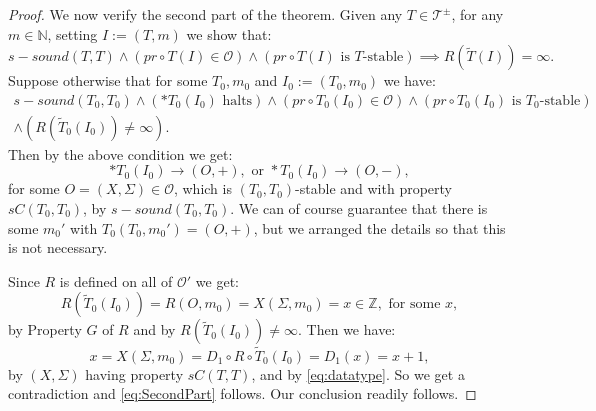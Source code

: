 \documentclass{amsart}  %
\numberwithin{equation}{section}
\theoremstyle{definition}
\theoremstyle{remark}
\DeclareMathOperator {\halt} {halt}
\begin{document}
{\begin{proof}
We now verify the second part of the theorem. 
Given any $T \in \mathcal{T} ^{\pm}  $, for any $m \in \mathbb{N}$, setting $I:= (T,m)$ we show that: 
   \begin{equation} \label{eq:SecondPart}
   s-sound (T,T) \land (pr \circ T (I) \in \mathcal{O})  \land ( pr \circ \text{$T (I)$ is $T$-stable} )  \implies R (\widetilde {T}(I)) = \infty.  \end{equation}
Suppose otherwise that for some $T _{0}, m _{0} $ and $I _{0}:= (T _{0}, m _{0}) $ 
   we have: 
    \begin{multline*}   s-sound (T _{0} , T _{0} ) \land (* T _{0}  (I _{0}) \text{ halts}) \land  (pr \circ T _{0} (I _{0} ) \in \mathcal{O}) \land ( pr \circ \text{$T _{0}  (I _{0} )$ is $T _{0} $-stable} )  \\ \land (R (\widetilde{T} _{0}   (I _{0} )) \neq \infty).
    \end{multline*}
  Then by the above condition we get: 
   \begin{equation} \label{eq:datatype}
  *T _{0}  (I _{0} ) \to (O,+), \text{ or } *T _{0}  (I _{0} ) \to (O,-),
\end{equation}
   for some  $O = (X,\Sigma) \in \mathcal{O}$, which is $(T _{0}, T _{0} )$-stable and with property $sC (T _{0} , T_{0} )$, by $s-sound (T _{0},T_{0}  )$. We can of course guarantee that there is some $m _{0}'$ with $T _{0}  (T_{0} , m _{0}' ) = (O,+)$, but we arranged the details so that this is not necessary. 

   Since $R$ is defined on all of $\mathcal{O}'$ we get: $$R (\widetilde{T} _{0}   (I _{0} )) = R (O, m _{0}) =  X   (\Sigma, m _{0}  ) =x \in \mathbb{Z}, \text{ for some $x$},  $$ 
   by Property $G$ of $R$ and by $R (\widetilde{T} _{0}  (I _{0} )) \neq \infty$.
Then we have: $$
    x=X (\Sigma, m _{0}) =   D_1 \circ R \circ \widetilde{T} _{0}   (I _{0} )= D _{1} (x)= x+1,
   $$  
by $(X, \Sigma)$ having property $sC (T, T)$, and by \eqref{eq:datatype}.
So we get a contradiction and \eqref{eq:SecondPart} follows.  Our conclusion readily follows.
\end{proof}

}
\end{document}
